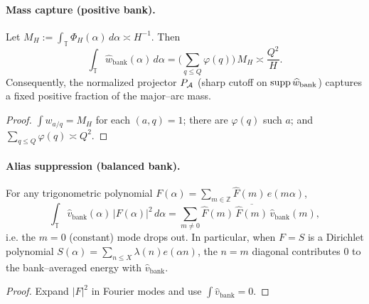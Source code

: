\paragraph{Mass capture (positive bank).}
\begin{lemma}\label{lem:bank-mass}
Let $M_H:=\int_{\mathbb T}\Phi_H(\alpha)\,d\alpha\asymp H^{-1}$. Then
\[
\int_{\mathbb T}\widehat w_{\mathrm{bank}}(\alpha)\,d\alpha
=\Big(\sum_{q\le Q}\varphi(q)\Big)\,M_H
\asymp \frac{Q^2}{H}.
\]
Consequently, the normalized projector $P_{\mathcal{A}}$ (sharp cutoff on $\operatorname{supp} \widehat w_{\mathrm{bank}}$) captures a fixed positive fraction of the major–arc mass.
\end{lemma}
\begin{proof}
$\int w_{a/q}=M_H$ for each $(a,q)=1$; there are $\varphi(q)$ such $a$; and
$\sum_{q\le Q}\varphi(q)\asymp Q^2$.
\end{proof}

\paragraph{Alias suppression (balanced bank).}
\begin{lemma}\label{lem:alias-meanzero}
For any trigonometric polynomial $F(\alpha)=\sum_{m\in\mathbb Z} \widehat F(m)\,e(m\alpha)$,
\[
\int_{\mathbb T}\widehat v_{\mathrm{bank}}(\alpha)\,|F(\alpha)|^2\,d\alpha
=\sum_{m\ne 0} \widehat F(m)\,\overline{\widehat F(m)}\, \widehat v_{\mathrm{bank}}^{\ }(m),
\]
i.e. the $m=0$ (constant) mode drops out. In particular, when $F=S$ is a Dirichlet polynomial $S(\alpha)=\sum_{n\le X}\lambda(n)e(\alpha n)$,
the $n=m$ diagonal contributes $0$ to the bank–averaged energy with $\widehat v_{\mathrm{bank}}$.
\end{lemma}
\begin{proof}
Expand $|F|^2$ in Fourier modes and use $\int \widehat v_{\mathrm{bank}}=0$.
\end{proof}

